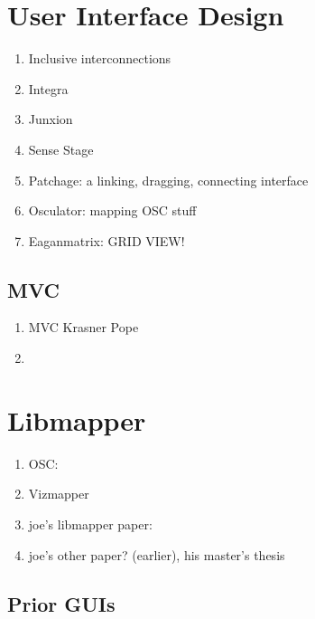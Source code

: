 \section{User Interface Design}
	\begin{enumerate}
		\item Inclusive interconnections 
		\item Integra 
		\item Junxion 
		\item Sense Stage 
		\item Patchage: a linking, dragging, connecting interface 
		\item Osculator: mapping OSC stuff 
		\item Eaganmatrix: GRID VIEW! 
	\end{enumerate}
		\subsection{MVC}
			\begin{enumerate}
				\item MVC Krasner Pope 
				\item \cite{}
			\end{enumerate}

\section{Libmapper}
	\begin{enumerate}
		\item OSC: 
		\item Vizmapper 
		\item joe's libmapper paper: 
		\item joe's other paper? (earlier), his master's thesis
	\end{enumerate}
	\subsection{Prior GUIs}
	\label{sec:priorGUIs}
